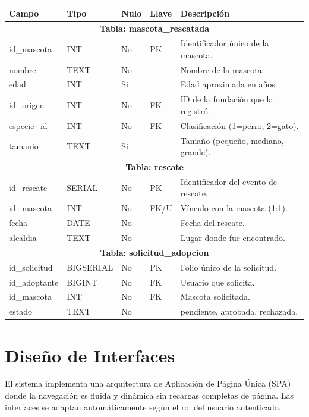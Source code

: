 \documentclass[12pt,a4paper]{article}
\begin{document}
\begin{longtable}{|p{3.5cm}|p{2cm}|p{1cm}|p{1.5cm}|p{5cm}|}
\hline
\textbf{Campo} & \textbf{Tipo} & \textbf{Nulo} & \textbf{Llave} & \textbf{Descripción} \\
\hline
\multicolumn{5}{|c|}{\textbf{Tabla: mascota\_rescatada}} \\
\hline
id\_mascota & INT & No & PK & Identificador único de la mascota. \\
nombre & TEXT & No & & Nombre de la mascota. \\
edad & INT & Si & & Edad aproximada en años. \\
id\_origen & INT & No & FK & ID de la fundación que la registró. \\
especie\_id & INT & No & FK & Clasificación (1=perro, 2=gato). \\
tamanio & TEXT & Si & & Tamaño (pequeño, mediano, grande). \\
\hline
\multicolumn{5}{|c|}{\textbf{Tabla: rescate}} \\
\hline
id\_rescate & SERIAL & No & PK & Identificador del evento de rescate. \\
id\_mascota & INT & No & FK/U & Vínculo con la mascota (1:1). \\
fecha & DATE & No & & Fecha del rescate. \\
alcaldia & TEXT & No & & Lugar donde fue encontrado. \\
\hline
\multicolumn{5}{|c|}{\textbf{Tabla: solicitud\_adopcion}} \\
\hline
id\_solicitud & BIGSERIAL & No & PK & Folio único de la solicitud. \\
id\_adoptante & BIGINT & No & FK & Usuario que solicita. \\
id\_mascota & INT & No & FK & Mascota solicitada. \\
estado & TEXT & No & & pendiente, aprobada, rechazada. \\
\hline
\end{longtable}

\section{Diseño de Interfaces}

El sistema implementa una arquitectura de Aplicación de Página Única (SPA) donde la navegación es fluida y dinámica sin recargas completas de página. Las interfaces se adaptan automáticamente según el rol del usuario autenticado.
\end{document}
